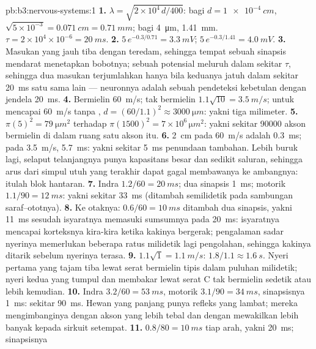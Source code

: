 \begin{solution}{pb:b3:nervous-systems:1}
\textbf{1.} $\lambda = \sqrt{2\times 10^{4}\,d/400}$: bagi $d =
\qty{1e-4}{cm}$, $\sqrt{5\times 10^{-3}} = \qty{0.071}{cm} =
\qty{0.71}{mm}$; bagi \qty{4}{\micro m}, \qty{1.41}{mm}. $\tau = 2\times
10^{4}\times 10^{-6} = \qty{20}{ms}$.
\textbf{2.} $5\,e^{-0.3/0.71} = \qty{3.3}{mV}$; $5\,e^{-0.3/1.41} =
\qty{4.0}{mV}$.
\textbf{3.} Masukan yang jauh tiba dengan teredam, sehingga tempat sebuah sinapsis mendarat
menetapkan bobotnya; sebuah potensial meluruh dalam sekitar $\tau$, sehingga dua masukan
terjumlahkan hanya bila keduanya jatuh dalam sekitar \qty{20}{ms} satu sama lain --- neuronnya
adalah sebuah pendeteksi kebetulan dengan jendela \qty{20}{ms}.
\textbf{4.} Bermielin \qty{60}{m/s}; tak bermielin $1.1\sqrt{10} =
\qty{3.5}{m/s}$; untuk mencapai \qty{60}{m/s} tanpa , $d = (60/1.1)^{2}
\approx \qty{3000}{\micro m}$: yakni tiga milimeter.
\textbf{5.} $\pi(5)^{2} = \qty{79}{\micro m^2}$ terhadap $\pi(1500)^{2} =
7\times 10^{6}\,\unit{\micro m^2}$: yakni sekitar \num{90000} akson bermielin
di dalam ruang satu akson itu.
\textbf{6.} \qty{2}{cm} pada \qty{60}{m/s} adalah \qty{0.3}{ms}; pada
\qty{3.5}{m/s}, \qty{5.7}{ms}: yakni sekitar \qty{5}{ms} penundaan tambahan. Lebih buruk lagi,
selaput telanjangnya punya kapasitans besar dan sedikit saluran, sehingga
arus dari simpul utuh yang terakhir dapat gagal membawanya ke ambangnya:
itulah blok hantaran.
\textbf{7.} Indra $1.2/60 = \qty{20}{ms}$; dua sinapsis \qty{1}{ms};
motorik $1.1/90 = \qty{12}{ms}$: yakni sekitar \qty{33}{ms} (ditambah semilidetik
pada sambungan saraf--ototnya).
\textbf{8.} Ke otaknya: $0.6/60 = \qty{10}{ms}$ ditambah dua sinapsis,
yakni \qty{11}{ms} sesudah isyaratnya memasuki sumsumnya pada \qty{20}{ms}:
isyaratnya mencapai korteksnya kira-kira ketika kakinya bergerak;
pengalaman sadar nyerinya memerlukan beberapa ratus milidetik lagi
pengolahan, sehingga kakinya ditarik sebelum nyerinya terasa.
\textbf{9.} $1.1\sqrt{1} = \qty{1.1}{m/s}$: $1.8/1.1 \approx
\qty{1.6}{s}$. Nyeri pertama yang tajam tiba lewat serat bermielin tipis
dalam puluhan milidetik; nyeri kedua yang tumpul dan membakar lewat
serat C tak bermielin sedetik atau lebih kemudian.
\textbf{10.} Indra $3.2/60 = \qty{53}{ms}$, motorik $3.1/90 =
\qty{34}{ms}$, sinapsisnya \qty{1}{ms}: sekitar \qty{90}{ms}. Hewan yang panjang
punya refleks yang lambat; mereka mengimbanginya dengan akson yang lebih tebal dan dengan
mewakilkan lebih banyak kepada sirkuit setempat.
\textbf{11.} $0.8/80 = \qty{10}{ms}$ tiap arah, yakni \qty{20}{ms}; sinapsisnya

\end{solution}
